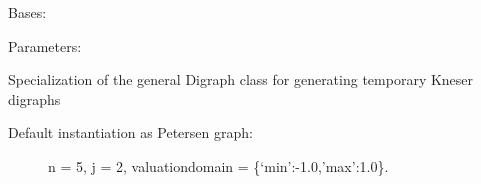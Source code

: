 \documentclass[letterpaper,10pt,english]{sphinxmanual}
\begin{document}
\begin{fulllineitems}
\label{techDoc:digraphs.KneserDigraph}
Bases: {\hyperref[techDoc:digraphs.Digraph]{\emph{}}}
\begin{description}
\item[{Parameters:}] \leavevmode
{}

\end{description}

Specialization of the general Digraph class for generating
temporary Kneser digraphs
\begin{description}
\item[{Default instantiation as Petersen graph:}] \leavevmode
n = 5, j = 2, valuationdomain = \{`min':-1.0,'max':1.0\}.

\end{description}

\begin{fulllineitems}
\label{techDoc:digraphs.KneserDigraph.showShort}
\end{fulllineitems}


\end{fulllineitems}

\end{document}

